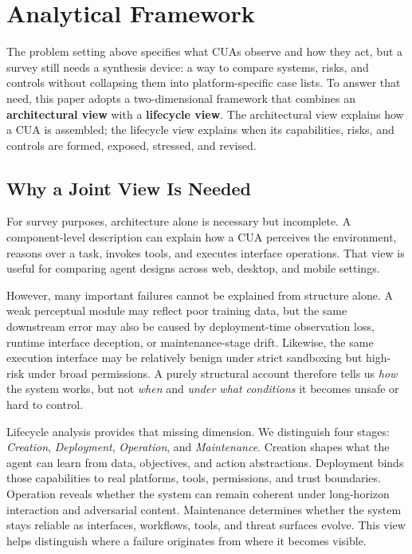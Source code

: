 \section{Analytical Framework}
\label{sec:framework}

The problem setting above specifies what CUAs observe and how they act, but a survey still needs a synthesis device: a way to compare systems, risks, and controls without collapsing them into platform-specific case lists. To answer that need, this paper adopts a two-dimensional framework that combines an \textbf{architectural view} with a \textbf{lifecycle view}. The architectural view explains how a CUA is assembled; the lifecycle view explains when its capabilities, risks, and controls are formed, exposed, stressed, and revised.

\subsection{Why a Joint View Is Needed}
For survey purposes, architecture alone is necessary but incomplete. A component-level description can explain how a CUA perceives the environment, reasons over a task, invokes tools, and executes interface operations. That view is useful for comparing agent designs across web, desktop, and mobile settings.

However, many important failures cannot be explained from structure alone. A weak perceptual module may reflect poor training data, but the same downstream error may also be caused by deployment-time observation loss, runtime interface deception, or maintenance-stage drift. Likewise, the same execution interface may be relatively benign under strict sandboxing but high-risk under broad permissions. A purely structural account therefore tells us \emph{how} the system works, but not \emph{when} and \emph{under what conditions} it becomes unsafe or hard to control.

Lifecycle analysis provides that missing dimension. We distinguish four stages:
\emph{Creation}, \emph{Deployment}, \emph{Operation}, and \emph{Maintenance}. Creation shapes what the agent can learn from data, objectives, and action abstractions. Deployment binds those capabilities to real platforms, tools, permissions, and trust boundaries. Operation reveals whether the system can remain coherent under long-horizon interaction and adversarial content. Maintenance determines whether the system stays reliable as interfaces, workflows, tools, and threat surfaces evolve. This view helps distinguish where a failure originates from where it becomes visible.

